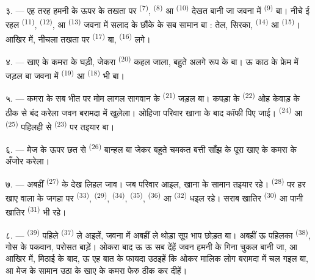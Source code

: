३. --- एह तरह हमनी के ऊपर के तखता पर 
\textsuperscript{(7)},  \textsuperscript{(8)} आ 
\textsuperscript{(10)} देखत बानी जा जवना में 
\textsuperscript{(9)} बा। नीचे ई रहल  \textsuperscript{(11)}, 
\textsuperscript{(12)}, आ  \textsuperscript{(13)}
जवना में सलाद के छौंके के सब सामान बा : तेल, सिरका, 
\textsuperscript{(14)} आ  \textsuperscript{(15)}। आखिर
में, नीचला तखता पर  \textsuperscript{(17)} बा,
 \textsuperscript{(16)} लगे।

४. --- खाए के कमरा के घड़ी, जेकरा 
\textsuperscript{(20)} कहल जाला, बहुते अलगे रूप के बा। ऊ काठ के फ्रेम में
जड़ल बा जवना में  \textsuperscript{(19)} आ
 \textsuperscript{(18)} भी बा।

\VUsaut{4.6mm}
\VUsaut{3.0mm}

५. --- कमरा के सब भीत पर मोम लागल सागवान के 
\textsuperscript{(21)} जड़ल बा। कपड़ा के 
\textsuperscript{(22)} ओह केवाड़ के ठीक से बंद करेला जवन बरामदा में
खुलेला। ओहिजा परिवार खाना के बाद कॉफी पिए जाई। 
\textsuperscript{(24)} आ  \textsuperscript{(25)} पहिलही से
 \textsuperscript{(23)} पर तइयार बा।

६. --- मेज के ऊपर छत से  \textsuperscript{(26)} बान्हल
बा जेकर बहुते चमकत बत्ती साँझ के पूरा खाए के कमरा के अँजोर करेला।

७. --- अबहीं  \textsuperscript{(27)} के देख लिहल जाव। जब
परिवार आइल, खाना के सामान तइयार रहे।  \textsuperscript{(28)}
पर हर खाए वाला के जगहा पर  \textsuperscript{(33)},
 \textsuperscript{(29)},  \textsuperscript{(34)},
 \textsuperscript{(35)},  \textsuperscript{(36)}
आ  \textsuperscript{(32)} धइल रहे। सराब खातिर
 \textsuperscript{(30)} आ पानी खातिर 
\textsuperscript{(31)} भी रहे।

८. ---  \textsuperscript{(39)} पहिले 
\textsuperscript{(37)} ले अइलें, जवना में अबहीं ले थोड़ा सूप भाप छोड़त बा।
अबहीं ऊ पहिलका  \textsuperscript{(38)}, गोस के पकवान, परोसत
बाड़ें। ओकरा बाद ऊ ऊ सब देंहें जवन हमनी के गिना चुकल बानी जा, आ आखिर
में, मिठाई के बाद, ऊ एह बात के फायदा उठइहें कि ओकर मालिक लोग बरामदा में
चल गइल बा, आ मेज के सामान उठा के खाए के कमरा फेरु ठीक कर दीहें।

